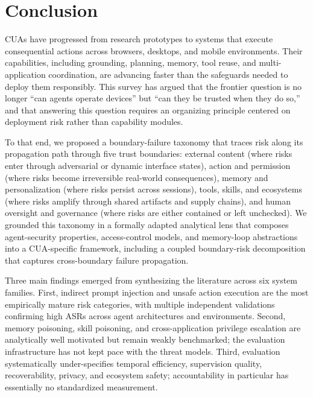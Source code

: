 
\section{Conclusion}

CUAs have progressed from research prototypes to systems that execute consequential actions across browsers, desktops, and mobile environments. Their capabilities, including grounding, planning, memory, tool reuse, and multi-application coordination, are advancing faster than the safeguards needed to deploy them responsibly. This survey has argued that the frontier question is no longer ``can agents operate devices'' but ``can they be trusted when they do so,'' and that answering this question requires an organizing principle centered on deployment risk rather than capability modules.

To that end, we proposed a boundary-failure taxonomy that traces risk along its propagation path through five trust boundaries: external content (where risks enter through adversarial or dynamic interface states), action and permission (where risks become irreversible real-world consequences), memory and personalization (where risks persist across sessions), tools, skills, and ecosystems (where risks amplify through shared artifacts and supply chains), and human oversight and governance (where risks are either contained or left unchecked). We grounded this taxonomy in a formally adapted analytical lens that composes agent-security properties, access-control models, and memory-loop abstractions into a CUA-specific framework, including a coupled boundary-risk decomposition that captures cross-boundary failure propagation.

Three main findings emerged from synthesizing the literature across six system families. First, indirect prompt injection and unsafe action execution are the most empirically mature risk categories, with multiple independent validations confirming high ASRs across agent architectures and environments. Second, memory poisoning, skill poisoning, and cross-application privilege escalation are analytically well motivated but remain weakly benchmarked; the evaluation infrastructure has not kept pace with the threat models. Third, evaluation systematically under-specifies temporal efficiency, supervision quality, recoverability, privacy, and ecosystem safety; accountability in particular has essentially no standardized measurement.

